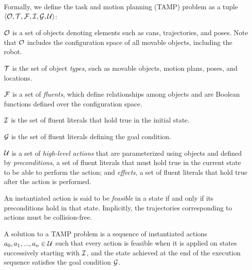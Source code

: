 \begin{defn}
Formally, we define the task and motion planning (TAMP) problem as a tuple $\langle \mathcal{O},
 \mathcal{T}, \mathcal{F}, \mathcal{I}, \mathcal{G}, \mathcal{U} \rangle$:
\begin{tightlist}
\item $\mathcal{O}$ is a set of objects denoting elements such as cans,
  trajectories, and poses. Note that $\mathcal{O}$ includes the
  configuration space of all movable objects, including the robot.
\item $\mathcal{T}$ is the set of object \emph{types}, such as movable objects, motion plans, poses, and locations.
\item $\mathcal{F}$ is a set of \emph{fluents}, which define relationships
  among objects and are Boolean functions defined over the configuration space.
\item $\mathcal{I}$ is the set of fluent literals that hold true in the initial state.
\item $\mathcal{G}$ is the set of fluent literals defining the goal condition.
\item $\mathcal{U}$ is a set of \emph{high-level actions} that are
  parameterized using objects and defined by \emph{preconditions}, a set
of fluent literals that must hold true in the current state to be able to perform the action;
and \emph{effects}, a set of fluent literals that hold true after the
action is performed. 
\end{tightlist}
\end{defn}

An instantiated action is said to be \emph{feasible} in a state if and only if its
preconditions hold in that state. Implicitly, the trajectories corresponding to actions
must be collision-free.

A solution to a TAMP problem is a sequence of instantiated
actions $a_{0}, a_{1}, ..., a_{n} \in \mathcal{U}$ such that every action is
feasible when it is applied on states successively starting with $\mathcal{I}$, and the
state achieved at the end of the execution sequence satisfies the
goal condition $\mathcal{G}$.



